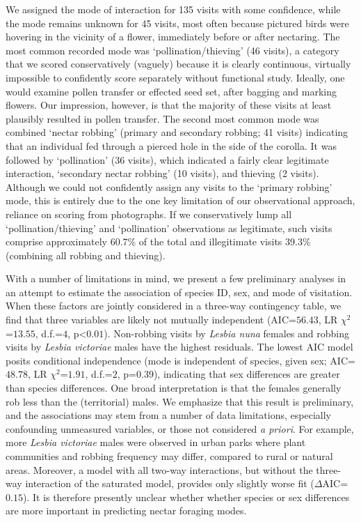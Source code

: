 \documentclass[fleqn,10pt,lineno]{wlpeerj}
\begin{document}
We assigned the mode of interaction for 135 visits with some confidence, while the mode remains unknown for 45 visits, most often because pictured birds were hovering in the vicinity of a flower, immediately before or after nectaring.
The most common recorded mode was `pollination/thieving' (46 visits), a category that we scored conservatively (vaguely) because it is clearly continuous, virtually impossible to confidently score separately without functional study. 
Ideally, one would examine pollen transfer or effected seed set, after bagging and marking flowers.
Our impression, however, is that the majority of these visits at least plausibly resulted in pollen transfer. 
The second most common mode was combined `nectar robbing' (primary and secondary robbing; 41 visits) indicating that an individual fed through a pierced hole in the side of the corolla.
It was followed by `pollination' (36 visits), which indicated a fairly clear legitimate interaction, `secondary nectar robbing' (10 visits), and thieving (2 visits). 
Although we could not confidently assign any visits to the `primary robbing' mode, this is entirely due to the one key limitation of our observational approach, reliance on scoring from photographs.
If we conservatively lump all `pollination/thieving' and `pollination' observations as legitimate, such visits comprise approximately 60.7\% of the total and illegitimate visits 39.3\% (combining all robbing and thieving).

With a number of limitations in mind, we present a few preliminary analyses in an attempt to estimate the association of species ID, sex, and mode of visitation. 
When these factors are jointly considered in a three-way contingency table, we find that three variables are likely not mutually independent (AIC=$56.43$, LR $\chi^{2}$=$13.55$, d.f.=$4$, p<$0.01$).
Non-robbing visits by \textit{Lesbia nuna} females and robbing visits by \textit{Lesbia victoriae} males have the highest residuals.
The lowest AIC model posits conditional independence (mode is independent of species, given sex; AIC=$48.78$, LR $\chi^{2}$=$1.91$, d.f.=$2$, p=$0.39$), indicating that sex differences are greater than species differences.
One broad interpretation is that the females generally rob less than the (territorial) males.
We emphasize that this result is preliminary, and the associations may stem from a number of data limitations, especially confounding unmeasured variables, or those not considered \textit{a priori}. 
For example, more \textit{Lesbia victoriae} males were observed in urban parks where plant communities and robbing frequency may differ, compared to rural or natural areas.
Moreover, a model with all two-way interactions, but without the three-way interaction of the saturated model, provides only slightly worse fit ($\Delta$AIC=$0.15$). It is therefore presently unclear whether whether species or sex differences are more important in predicting nectar foraging modes.
\end{document}
